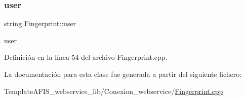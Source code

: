 \subsubsection{\texorpdfstring{user}{user}}
{\footnotesize\ttfamily string Fingerprint\+::user}



user 



Definición en la línea 54 del archivo Fingerprint.\+cpp.



La documentación para esta clase fue generada a partir del siguiente fichero\+:\begin{DoxyCompactItemize}
\item 
Template\+A\+F\+I\+S\+\_\+webservice\+\_\+lib/\+Conexion\+\_\+webservice/\hyperlink{Fingerprint_8cpp}{Fingerprint.\+cpp}\end{DoxyCompactItemize}
